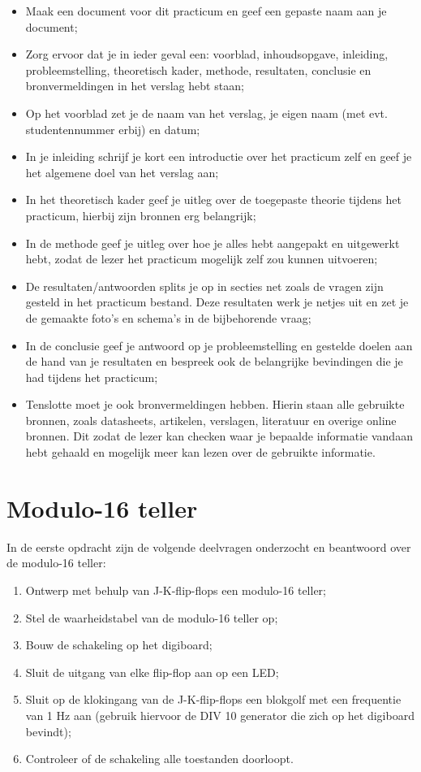 \documentclass[12pt]{article}
\begin{document}
\begin{itemize}
    \item Maak een document voor dit practicum en geef een gepaste naam aan je document;
    \item Zorg ervoor dat je in ieder geval een: voorblad, inhoudsopgave, inleiding, probleemstelling, theoretisch kader, methode, resultaten, conclusie en bronvermeldingen in het verslag hebt staan;
    \item Op het voorblad zet je de naam van het verslag, je eigen naam (met evt. studentennummer erbij) en datum;
    \item In je inleiding schrijf je kort een introductie over het practicum zelf en geef je het algemene doel van het verslag aan;
    \item In het theoretisch kader geef je uitleg over de toegepaste theorie tijdens het practicum, hierbij zijn bronnen erg belangrijk;
    \item In de methode geef je uitleg over hoe je alles hebt aangepakt en uitgewerkt hebt, zodat de lezer het practicum mogelijk zelf zou kunnen uitvoeren;
    \item De resultaten/antwoorden splits je op in secties net zoals de vragen zijn gesteld in het practicum bestand. Deze resultaten werk je netjes uit en zet je de gemaakte foto's en schema's in de bijbehorende vraag;
    \item In de conclusie geef je antwoord op je probleemstelling en gestelde doelen aan de hand van je resultaten en bespreek ook de belangrijke bevindingen die je had tijdens het practicum;
    \item Tenslotte moet je ook bronvermeldingen hebben. Hierin staan alle gebruikte bronnen, zoals datasheets, artikelen, verslagen, literatuur en overige online bronnen. Dit zodat de lezer kan checken waar je bepaalde informatie vandaan hebt gehaald en mogelijk meer kan lezen over de gebruikte informatie.
\end{itemize}
\pagebreak
\section{Modulo-16 teller}
In de eerste opdracht zijn de volgende deelvragen onderzocht en beantwoord over de modulo-16 teller:
\begin{enumerate}
    \item Ontwerp met behulp van J-K-flip-flops een modulo-16 teller;
    \item Stel de waarheidstabel van de modulo-16 teller op;
    \item Bouw de schakeling op het digiboard;
    \item Sluit de uitgang van elke flip-flop aan op een LED;
    \item Sluit op de klokingang van de J-K-flip-flops een blokgolf met een frequentie van 1 Hz aan (gebruik hiervoor de DIV 10 generator die zich op het digiboard bevindt);
    \item Controleer of de schakeling alle toestanden doorloopt.
\end{enumerate}
\pagebreak
\end{document}
